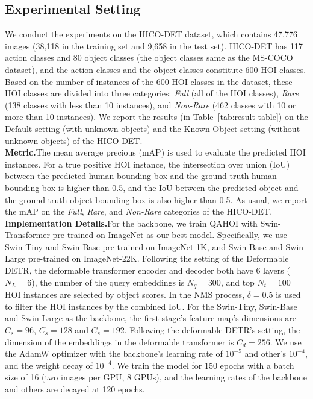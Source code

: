 \documentclass[10pt,twocolumn,letterpaper]{article}
\begin{document}
\subsection{Experimental Setting}
\space We conduct the experiments on the HICO-DET \cite{chao2018learning} dataset,
which contains 47,776 images (38,118 in the training set and 9,658 in the test set).
HICO-DET has 117 action classes and 80 object classes (the object classes same as the MS-COCO \cite{lin2014microsoft} dataset),
and the action classes and the object classes constitute 600 HOI classes.
Based on the number of instances of the 600 HOI classes in the dataset, these HOI classes are divided into three categories:
{\em Full} (all of the HOI classes), {\em Rare} (138 classes with less than 10 instances), and {\em Non-Rare} (462 classes with 10 or more than 10 instances).
We report the results (in Table~\ref{tab:result-table}) on the Default setting (with unknown objects) and the Known Object setting (without unknown objects) of the HICO-DET.
\\
{\bf Metric.}\space The mean average precious (mAP) is used to evaluate the predicted HOI instances.
For a true positive HOI instance,
the intersection over union (IoU) between the predicted human bounding box and the ground-truth human bounding box is higher than 0.5,
and the IoU between the predicted object and the ground-truth object bounding box is also higher than 0.5.
As usual, we report the mAP on the {\em Full}, {\em Rare}, and {\em Non-Rare} categories of the HICO-DET.
\\
{\bf Implementation Details.}\space For the backbone, we train QAHOI with Swin-Transformer \cite{liu2021swin} pre-trained on ImageNet \cite{deng2009imagenet} as our best model.
Specifically, we use Swin-Tiny and Swin-Base pre-trained on ImageNet-1K, and Swin-Base and Swin-Large pre-trained on ImageNet-22K.
Following the setting of the Deformable DETR, the deformable transformer encoder and decoder both have 6 layers ($N_{L}=6$),
the number of the query embeddings is $N_{q}=300$, and top $N_{t}=100$ HOI instances are selected by object scores.
In the NMS process, $\delta=0.5$ is used to filter the HOI instances by the combined IoU.
For the Swin-Tiny, Swin-Base and Swin-Large as the backbone, the first stage's feature map's dimensions are $C_{s}=96$, $C_{s}=128$ and $C_{s}=192$.
Following the deformable DETR's setting, the dimension of the embeddings in the deformable transformer is $C_{d}=256$.
We use the AdamW \cite{loshchilov2018decoupled} optimizer with the backbone's learning rate of $10^{-5}$ and other's $10^{-4}$, and the weight decay of $10^{-4}$. 
We train the model for 150 epochs with a batch size of 16 (two images per GPU, 8 GPUs),
and the learning rates of the backbone and others are decayed at 120 epochs.
\end{document}
